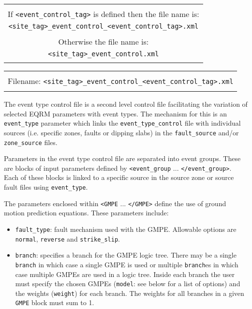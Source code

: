 \begin{center}
\begin{tabular}{|c|}
\hline
 \\
 If \texttt{<event\_control\_tag>} is defined then the file name is:\\
\texttt{<site\_tag>\_}\texttt{event\_control\_}\texttt{<event\_control\_tag>}\texttt{.xml}
\\
\\
Otherwise the file name is:\\
\texttt{<site\_tag>\_}\texttt{event\_control}\texttt{.xml}\\
\\
\hline
\end{tabular}
\end{center}


\begin{center}
\begin{tabular}{|c|}
\hline
\\
Filename: \texttt{<site\_tag>\_}\texttt{event\_control\_}\texttt{<event\_control\_tag>}\texttt{.xml}\\
\\
\hline
\end{tabular}
\end{center}

The event type control file is a second level control file
facilitating the variation of selected EQRM parameters with event
types. The mechanism for this is an \texttt{event\_type} parameter
which links the \texttt{event\_type\_control} file with individual
sources (i.e. specific zones, faults or dipping slabs) in the
\texttt{fault\_source} and/or \texttt{zone\_source} files.


Parameters in the event type control file are separated into event
groups. These are blocks of input parameters defined by
\texttt{<event\_group} ... \texttt{</event\_group>}. Each of these
blocks is linked to a specific source in the source zone or source
fault files using \texttt{event\_type}.

The parameters enclosed within \texttt{<GMPE} ... \texttt{</GMPE>}
define the use of ground motion prediction equations. These
parameters include:
\begin{itemize}
\item \texttt{fault\_type}: fault mechanism used with the GMPE.
Allowable options are \texttt{normal}, \texttt{reverse} and
\texttt{strike\_slip}.
\item \texttt{branch}: specifies a branch for the GMPE logic tree.
There may be a single \texttt{branch} in which case a single GMPE is
used or multiple \texttt{branch}es in which case multiple GMPEs are
used in a logic tree. Inside each branch the user must specify the
chosen GMPEs (\texttt{model}: see below for a list of options) and
the weights (\texttt{weight}) for each branch. The weights
for all branches in a given \texttt{GMPE} block must sum to 1.
\end{itemize}

